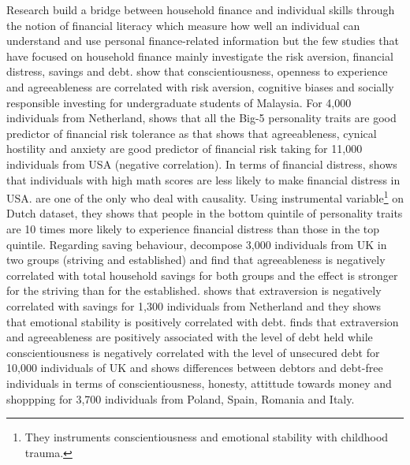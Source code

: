 \documentclass[a4paper, 11pt, onecolumn]{article}
\begin{document}
Research build a bridge between household finance and individual skills through the notion of financial literacy which measure how well an individual can understand and use personal finance-related information \citep{Huston2010, Hastings2013, Gaurav2012, Klapper2012} but the few studies that have focused on household finance mainly investigate the risk aversion, financial distress, savings and debt.
\cite{Nga2013} show that conscientiousness, openness to experience and agreeableness are correlated with risk aversion, cognitive biases and socially responsible investing for undergraduate students of Malaysia.
For 4,000 individuals from Netherland, \cite{Pinjisakikool2017} shows that all the Big-5 personality traits are good predictor of financial risk tolerance as \cite{Bucciol2017} that shows that agreeableness, cynical hostility and anxiety are good predictor of financial risk taking for 11,000 individuals from USA (negative correlation).
In terms of financial distress, \cite{Agarwal2013} shows that individuals with high math scores are less likely to make financial distress in USA.
\cite{Parise2019} are one of the only who deal with causality.
Using instrumental variable\footnote{They instruments conscientiousness and emotional stability with childhood trauma.} on Dutch dataset, they shows that people in the bottom quintile of personality traits are 10 times more likely to experience financial distress than those in the top quintile.
Regarding saving behaviour, \cite{Gerhard2018} decompose 3,000 individuals from UK in two groups (striving and established) and find that agreeableness is negatively correlated with total household savings for both groups and the effect is stronger for the striving than for the established.
\cite{Nyhus2001} shows that extraversion is negatively correlated with savings for 1,300 individuals from Netherland and they shows that emotional stability is positively correlated with debt.
\cite{Brown2014} finds that extraversion and agreeableness are positively associated with the level of debt held while conscientiousness is negatively correlated with the level of unsecured debt for 10,000 individuals of UK and \cite{Forlicz2019} shows differences between debtors and debt-free individuals in terms of conscientiousness, honesty, attittude towards money and shoppping for 3,700 individuals from Poland, Spain, Romania and Italy.
\end{document}
